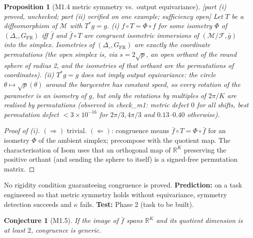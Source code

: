 \documentclass[11pt]{article}
\newtheorem{prop}{Proposition}
\newtheorem{conj}{Conjecture}
\theoremstyle{remark}\newtheorem{rem}{Remark}
\newcommand{\R}{\mathbb R}\newcommand{\Z}{\mathbb Z}
\newcommand{\FR}{\mathrm{FR}}\newcommand{\tr}{\operatorname{tr}}
\newcommand{\status}[1]{\hfill\textsf{[#1]}}
\begin{document}
\begin{prop}[M1.4 metric symmetry vs.\ output equivariance]\status{part (i) proved, unchecked; part (ii) verified on one example; sufficiency open}
Let $T$ be a diffeomorphism of $\mathcal M$ with $T^*g=g$.
(i) $f\circ T=\Phi\circ f$ for some isometry $\Phi$ of $(\Delta_\circ,G_{\FR})$ iff $\bar f$ and $\bar f\circ T$ are congruent isometric immersions of $(\mathcal M/\mathcal F,\bar g)$ into the simplex. Isometries of $(\Delta_\circ,G_{\FR})$ are exactly the coordinate permutations (the open simplex is, via $s=2\sqrt p$, an open orthant of the round sphere of radius 2, and the isometries of that orthant are the permutations of coordinates).
(ii) $T^*g=g$ does not imply output equivariance: the circle $\theta\mapsto\sqrt p(\theta)$ around the barycentre has constant speed, so \emph{every} rotation of the parameter is an isometry of $g$, but only the rotations by multiples of $2\pi/K$ are realised by permutations (observed in check\_m1: metric defect $0$ for all shifts, best permutation defect $<3\times10^{-16}$ for $2\pi/3,4\pi/3$ and $0.13$--$0.40$ otherwise).
\end{prop}
\begin{proof}[Proof of (i)]
$(\Rightarrow)$ trivial. $(\Leftarrow)$: congruence means $\bar f\circ T=\Phi\circ\bar f$ for an isometry $\Phi$ of the ambient simplex; precompose with the quotient map. The characterisation of $\mathrm{Isom}$ uses that an orthogonal map of $\R^K$ preserving the positive orthant (and sending the sphere to itself) is a signed-free permutation matrix. \qedhere
\end{proof}
No rigidity condition guaranteeing congruence is proved. \textbf{Prediction:} on a task engineered so that metric symmetry holds without equivariance, symmetry detection succeeds and $\kappa$ fails. \textbf{Test:} Phase 2 (task to be built).
\begin{conj}[M1.5] If the image of $\bar f$ spans $\R^K$ and its quotient dimension is at least $2$, congruence is generic.\end{conj}
\end{document}
